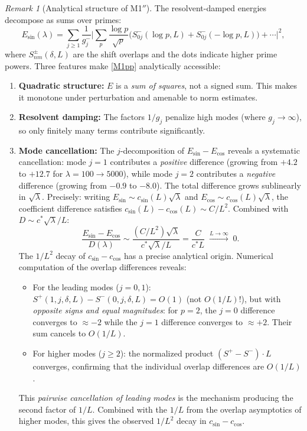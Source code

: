 \documentclass[12pt,a4paper]{article}
\theoremstyle{definition}
\theoremstyle{remark}
\newtheorem{remark}[theorem]{Remark}
\begin{document}
\begin{remark}[Analytical structure of M1$''$]
\label{rem:M1-analytical}
The resolvent-damped energies decompose as sums over primes:
\[
  E_{\sin}(\lambda) = \sum_{j \geq 1} \frac{1}{g_j^-}
  \biggl|\sum_p \frac{\log p}{\sqrt{p}}
  \bigl(S^-_{0j}(\log p, L) + S^-_{0j}(-\log p, L)\bigr) + \cdots\biggr|^2,
\]
where $S^\pm_{nm}(\delta, L)$ are the shift overlaps and the dots indicate higher prime powers. Three features make \ref{M1pp} analytically accessible:
\begin{enumerate}
  \item \textbf{Quadratic structure:} $E$ is a \emph{sum of squares}, not a signed sum. This makes it monotone under perturbation and amenable to norm estimates.
  \item \textbf{Resolvent damping:} The factors $1/g_j$ penalize high modes (where $g_j \to \infty$), so only finitely many terms contribute significantly.
  \item \textbf{Mode cancellation:} The $j$-decomposition of $E_{\sin} - E_{\cos}$ reveals a systematic cancellation: mode $j = 1$ contributes a \emph{positive} difference (growing from $+4.2$ to $+12.7$ for $\lambda = 100 \to 5000$), while mode $j = 2$ contributes a \emph{negative} difference (growing from $-0.9$ to $-8.0$). The total difference grows sublinearly in $\sqrt{\lambda}$. Precisely: writing $E_{\sin} \sim c_{\sin}(L)\sqrt{\lambda}$ and $E_{\cos} \sim c_{\cos}(L)\sqrt{\lambda}$, the coefficient difference satisfies $c_{\sin}(L) - c_{\cos}(L) \sim C/L^2$. Combined with $D \sim c^*\sqrt{\lambda}/L$:
  \[
    \frac{E_{\sin} - E_{\cos}}{D(\lambda)} \sim \frac{(C/L^2)\sqrt{\lambda}}{c^*\sqrt{\lambda}/L} = \frac{C}{c^* L} \;\xrightarrow{L \to \infty}\; 0.
  \]
  The $1/L^2$ decay of $c_{\sin} - c_{\cos}$ has a precise analytical origin. Numerical computation of the overlap differences reveals:
  \begin{itemize}
    \item For the leading modes ($j = 0, 1$): $S^+(1,j,\delta,L) - S^-(0,j,\delta,L) = O(1)$ (not $O(1/L)$!), but with \emph{opposite signs and equal magnitudes}: for $p = 2$, the $j = 0$ difference converges to $\approx -2$ while the $j = 1$ difference converges to $\approx +2$. Their sum cancels to $O(1/L)$.
    \item For higher modes ($j \geq 2$): the normalized product $(S^+ - S^-) \cdot L$ converges, confirming that the individual overlap differences are $O(1/L)$.
  \end{itemize}
  This \emph{pairwise cancellation of leading modes} is the mechanism producing the second factor of $1/L$. Combined with the $1/L$ from the overlap asymptotics of higher modes, this gives the observed $1/L^2$ decay in $c_{\sin} - c_{\cos}$.
\end{enumerate}
\end{remark}
\end{document}
